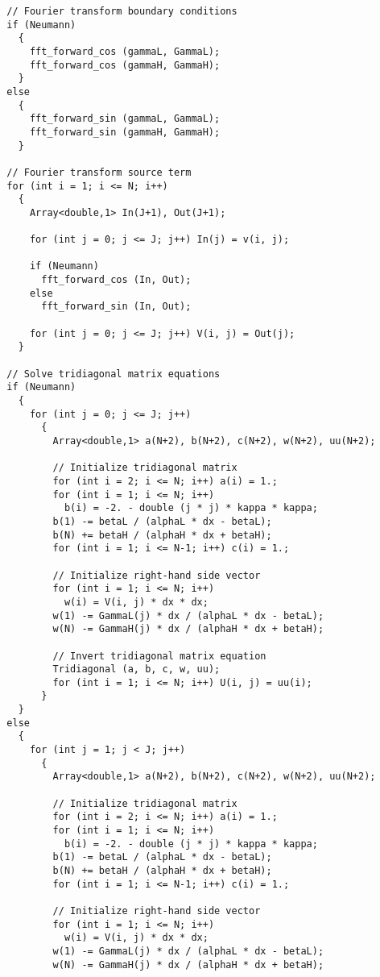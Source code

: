 {\begin{verbatim}
  // Fourier transform boundary conditions
  if (Neumann)
    {
      fft_forward_cos (gammaL, GammaL);
      fft_forward_cos (gammaH, GammaH);
    }
  else
    {
      fft_forward_sin (gammaL, GammaL);
      fft_forward_sin (gammaH, GammaH);
    }

  // Fourier transform source term
  for (int i = 1; i <= N; i++)
    {
      Array<double,1> In(J+1), Out(J+1);

      for (int j = 0; j <= J; j++) In(j) = v(i, j);

      if (Neumann)
        fft_forward_cos (In, Out);
      else
        fft_forward_sin (In, Out);

      for (int j = 0; j <= J; j++) V(i, j) = Out(j);
    }

  // Solve tridiagonal matrix equations
  if (Neumann)
    {
      for (int j = 0; j <= J; j++)
        {  
          Array<double,1> a(N+2), b(N+2), c(N+2), w(N+2), uu(N+2);

          // Initialize tridiagonal matrix
          for (int i = 2; i <= N; i++) a(i) = 1.;
          for (int i = 1; i <= N; i++)
            b(i) = -2. - double (j * j) * kappa * kappa;
          b(1) -= betaL / (alphaL * dx - betaL);
          b(N) += betaH / (alphaH * dx + betaH);
          for (int i = 1; i <= N-1; i++) c(i) = 1.;
	  
          // Initialize right-hand side vector
          for (int i = 1; i <= N; i++)
            w(i) = V(i, j) * dx * dx;
          w(1) -= GammaL(j) * dx / (alphaL * dx - betaL);
          w(N) -= GammaH(j) * dx / (alphaH * dx + betaH);
	  
          // Invert tridiagonal matrix equation
          Tridiagonal (a, b, c, w, uu);
          for (int i = 1; i <= N; i++) U(i, j) = uu(i);
        }
    }
  else
    {
      for (int j = 1; j < J; j++)
        { 
          Array<double,1> a(N+2), b(N+2), c(N+2), w(N+2), uu(N+2);

          // Initialize tridiagonal matrix
          for (int i = 2; i <= N; i++) a(i) = 1.;
          for (int i = 1; i <= N; i++)
            b(i) = -2. - double (j * j) * kappa * kappa;
          b(1) -= betaL / (alphaL * dx - betaL);
          b(N) += betaH / (alphaH * dx + betaH);
          for (int i = 1; i <= N-1; i++) c(i) = 1.;
	  
          // Initialize right-hand side vector
          for (int i = 1; i <= N; i++)
            w(i) = V(i, j) * dx * dx;
          w(1) -= GammaL(j) * dx / (alphaL * dx - betaL);
          w(N) -= GammaH(j) * dx / (alphaH * dx + betaH);
	  

\end{verbatim}}
